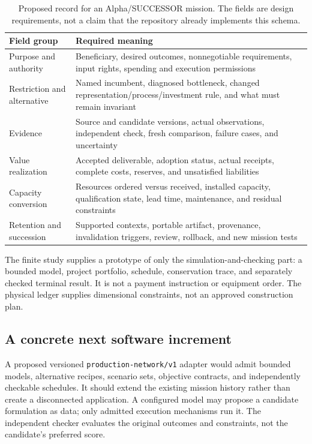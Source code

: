 \documentclass[11pt,letterpaper]{article}
\newcommand{\1}{\mathbf 1}
\theoremstyle{remark}\newtheorem{remark}{Remark}[section]
\begin{document}
\begin{table}[htbp]\centering\small
\caption{Proposed record for an Alpha/SUCCESSOR mission. The fields are design requirements, not a claim that the repository already implements this schema.}
\begin{tabularx}{\linewidth}{@{}P{.25\linewidth}Y@{}}\toprule
Field group & Required meaning\\\midrule
Purpose and authority & Beneficiary, desired outcomes, nonnegotiable requirements, input rights, spending and execution permissions\\
Restriction and alternative & Named incumbent, diagnosed bottleneck, changed representation/process/investment rule, and what must remain invariant\\
Evidence & Source and candidate versions, actual observations, independent check, fresh comparison, failure cases, and uncertainty\\
Value realization & Accepted deliverable, adoption status, actual receipts, complete costs, reserves, and unsatisfied liabilities\\
Capacity conversion & Resources ordered versus received, installed capacity, qualification state, lead time, maintenance, and residual constraints\\
Retention and succession & Supported contexts, portable artifact, provenance, invalidation triggers, review, rollback, and new mission tests\\\bottomrule
\end{tabularx}\label{tab:record}
\end{table}

The finite study supplies a prototype of only the simulation-and-checking part: a bounded model, project portfolio, schedule, conservation trace, and separately checked terminal result. It is not a payment instruction or equipment order. The physical ledger supplies dimensional constraints, not an approved construction plan.

\subsection{A concrete next software increment}
A proposed versioned \texttt{production-network/v1} adapter would admit bounded models, alternative recipes, scenario sets, objective contracts, and independently checkable schedules. It should extend the existing mission history rather than create a disconnected application. A configured model may propose a candidate formulation as data; only admitted execution mechanisms run it. The independent checker evaluates the original outcomes and constraints, not the candidate's preferred score.
\end{document}
